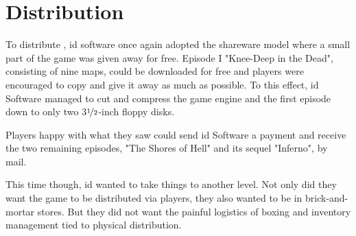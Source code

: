 \section{Distribution}
To distribute \doom, id software once again adopted the shareware model where a small part of the game was given away for free. Episode I "Knee-Deep in the Dead", consisting of nine maps, could be downloaded for free and players were encouraged to copy and give it away as much as possible. To this effect, id Software managed to cut and compress the game engine and the first episode down to only two 3$\nicefrac{1}{2}$-inch floppy disks.\\
\par 
Players happy with what they saw could send id Software a payment and receive the two remaining episodes, "The Shores of Hell" and its sequel "Inferno", by mail.\\
\par
{}
\par
This time though, id wanted to take things to another level. Not only did they want the game to be distributed via players, they also wanted to be in brick-and-mortar stores. But they did not want the painful logistics of boxing and inventory management tied to physical distribution.\newpage





